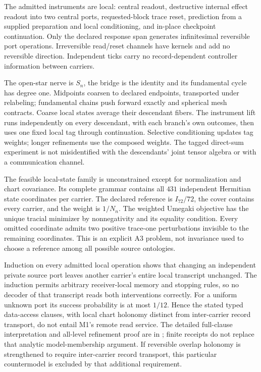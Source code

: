 The admitted instruments are local: central readout, destructive internal
effect readout into two central ports, requested-block trace reset,
prediction from a supplied preparation and local conditioning, and in-place
checkpoint continuation. Only the declared response span generates
infinitesimal reversible port operations. Irreversible read/reset channels
have kernels and add no reversible direction. Independent ticks carry no
record-dependent controller information between carriers.

The open-star nerve is $S_n$, the bridge is the identity and its fundamental
cycle has degree one. Midpoints coarsen to declared endpoints, transported
under relabeling; fundamental chains push forward exactly and spherical
mesh contracts. Coarse local states average their descendant fibers.
The instrument lift runs independently on every descendant, with each
branch's own outcomes, then uses one fixed local tag through continuation.
Selective conditioning updates tag weights; longer refinements use the
composed weights. The tagged direct-sum experiment is not misidentified
with the descendants' joint tensor algebra or with a communication channel.

The feasible local-state family is unconstrained except for normalization
and chart covariance. Its complete grammar contains all $431$ independent
Hermitian state coordinates per carrier. The declared reference is
$I_{72}/72$, the cover contains every carrier, and the weight is $1/N_n$.
The weighted Umegaki objective has the unique tracial minimizer by
nonnegativity and its equality condition. Every omitted coordinate admits
two positive trace-one perturbations invisible to the remaining coordinates.
This is an explicit A3 problem, not invariance used to choose a reference
among all possible source ontologies.

Induction on every admitted local operation shows that changing an
independent private source port leaves another carrier's entire local
transcript unchanged. The induction permits arbitrary receiver-local
memory and stopping rules, so no decoder of that transcript reads both
interventions correctly. For a uniform unknown port its success probability
is at most $1/12$. Hence the stated typed data-access clauses, with local
chart holonomy distinct from inter-carrier record transport, do not entail
M1's remote read service. The detailed full-clause interpretation and
all-level refinement proof are in
; finite receipts do not
replace that analytic model-membership argument. If reversible overlap
holonomy is strengthened to require inter-carrier record transport, this
particular countermodel is excluded by that additional requirement.

